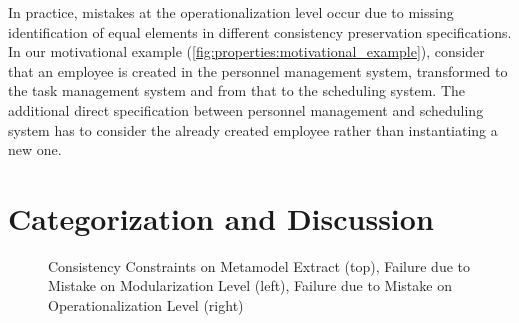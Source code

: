 In practice, mistakes at the operationalization level occur due to missing identification of equal elements in different consistency preservation specifications. 
In our motivational example (\autoref{fig:properties:motivational_example}), %
consider that an employee is created in the personnel management system, transformed to the task management system and from that to the scheduling system.
The additional direct specification between personnel management and scheduling system has to consider the already created employee rather than instantiating a new one.




\section{Categorization and Discussion}
\label{chap:errors:categorization}

\begin{figure}[tb]
    \centering
    
    \caption{Consistency Constraints on Metamodel Extract (top), Failure due to Mistake on Modularization Level (left), Failure due to Mistake on Operationalization Level (right)}
    \label{fig:correctness:mistake_effects_example}
\end{figure}

